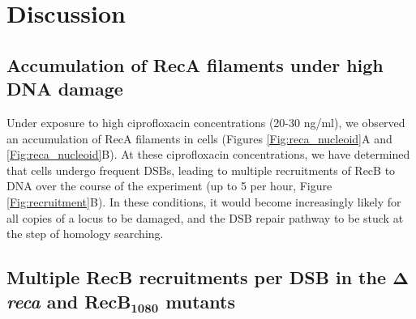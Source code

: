 \section*{Discussion}

\subsection*{Accumulation of RecA filaments under high DNA damage}
Under exposure to high ciprofloxacin concentrations (20-30 ng/ml), we observed an accumulation of RecA filaments in cells (Figures \ref{Fig:reca_nucleoid}A and \ref{Fig:reca_nucleoid}B). At these ciprofloxacin concentrations, we have determined that cells undergo frequent DSBs, leading to multiple recruitments of RecB to DNA over the course of the experiment (up to 5 per hour, Figure \ref{Fig:recruitment}B). In these conditions, it would become increasingly likely for all copies of a locus to be damaged, and the DSB repair pathway to be stuck at the step of homology searching.

\subsection*{Multiple RecB recruitments per DSB in the $\mathbf{\Delta}$\emph{reca} and RecB$\mathbf{_{1080}}$ mutants}

